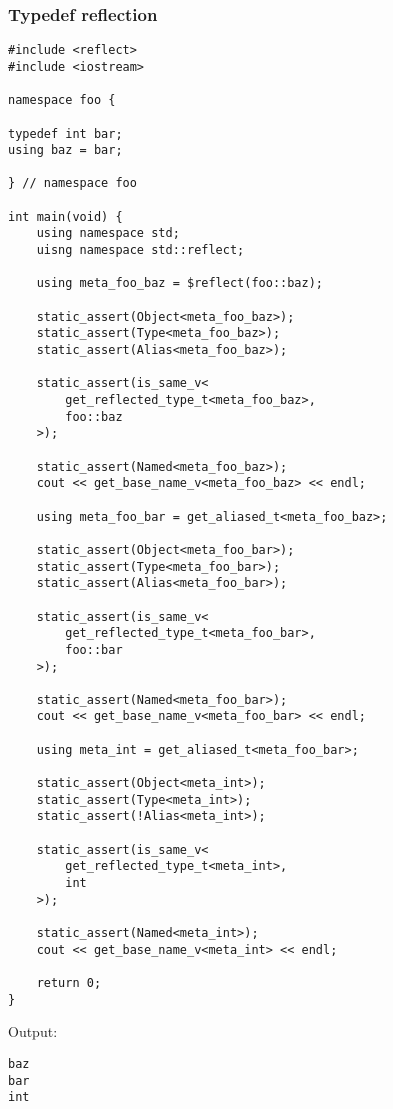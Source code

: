 \subsubsection{Typedef reflection}

\begin{verbatim}
#include <reflect>
#include <iostream>

namespace foo {

typedef int bar;
using baz = bar;

} // namespace foo

int main(void) {
	using namespace std;
	uisng namespace std::reflect;

	using meta_foo_baz = $reflect(foo::baz);

	static_assert(Object<meta_foo_baz>);
	static_assert(Type<meta_foo_baz>);
	static_assert(Alias<meta_foo_baz>);

	static_assert(is_same_v<
		get_reflected_type_t<meta_foo_baz>,
		foo::baz
	>);

	static_assert(Named<meta_foo_baz>);
	cout << get_base_name_v<meta_foo_baz> << endl;

	using meta_foo_bar = get_aliased_t<meta_foo_baz>;

	static_assert(Object<meta_foo_bar>);
	static_assert(Type<meta_foo_bar>);
	static_assert(Alias<meta_foo_bar>);

	static_assert(is_same_v<
		get_reflected_type_t<meta_foo_bar>,
		foo::bar
	>);

	static_assert(Named<meta_foo_bar>);
	cout << get_base_name_v<meta_foo_bar> << endl;

	using meta_int = get_aliased_t<meta_foo_bar>;

	static_assert(Object<meta_int>);
	static_assert(Type<meta_int>);
	static_assert(!Alias<meta_int>);

	static_assert(is_same_v<
		get_reflected_type_t<meta_int>,
		int
	>);

	static_assert(Named<meta_int>);
	cout << get_base_name_v<meta_int> << endl;

	return 0;
}

\end{verbatim}

Output:

\begin{verbatim}
baz
bar
int
\end{verbatim}

